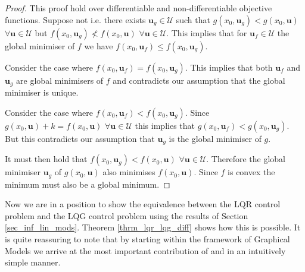 \begin{proof}
This proof hold over differentiable and non-differentiable objective functions. Suppose not i.e. there exists  $\mathbf{u}_g \in \mathcal{U}$ such that $g(x_0, \mathbf{u}_g) < g(x_0, \mathbf{u})$ $\forall \mathbf{u} \in \mathcal{U}$ but $f(x_0, \mathbf{u}_g) \nless f(x_0, \mathbf{u})$ $\forall \mathbf{u} \in \mathcal{U}$. This implies that for $\mathbf{u}_f \in \mathcal{U}$ the global minimiser of $f$  we have $f(x_0, \mathbf{u}_f) \leq f(x_0, \mathbf{u}_g)$. 

Consider the case where $f(x_0, \mathbf{u}_f) = f(x_0, \mathbf{u}_g)$. This implies that both $\mathbf{u}_f$ and $\mathbf{u}_g$ are global minimisers of $f$ and contradicts our assumption that the global minimiser is unique.

Consider the case where $f(x_0, \mathbf{u}_f) < f(x_0, \mathbf{u}_g)$. Since $g(x_0, \mathbf{u}) + k = f(x_0, \mathbf{u})$ $\forall \mathbf{u} \in \mathcal{U}$ this implies that $g(x_0, \mathbf{u}_f) < g(x_0, \mathbf{u}_g)$. But this contradicts our assumption that $\mathbf{u}_g$ is the global minimiser of $g$.

It must then hold that $f(x_0, \mathbf{u}_g) < f(x_0, \mathbf{u})$ $\forall \mathbf{u} \in \mathcal{U}$. Therefore the global minimiser $\mathbf{u}_g$ of $g(x_0, \mathbf{u})$ also minimises $f(x_0, \mathbf{u})$. Since $f$ is convex the minimum must also be a global minimum.
\end{proof}
Now we are in a position to show the equivalence between the LQR control problem and the LQG control problem using the results of Section \ref{sec_inf_lin_mods}. Theorem \ref{thrm_lqr_lqg_diff} shows how this is possible. It is quite reassuring to note that by starting within the framework of Graphical Models we arrive at the most important contribution of \cite{yan1} and \cite{yan2} in an intuitively simple manner.
